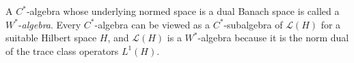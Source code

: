 A $C^*$-algebra whose underlying normed space is a dual Banach space is called a $W^*$-\textit{algebra}. Every $C^*$-algebra can be viewed as a $C^*$-subalgebra of $\mathcal{L}(H)$ for a suitable Hilbert space $H$, and $\mathcal{L}(H)$ is a $W^*$-algebra because it is the norm dual of the trace class operators $L^1(H)$.
